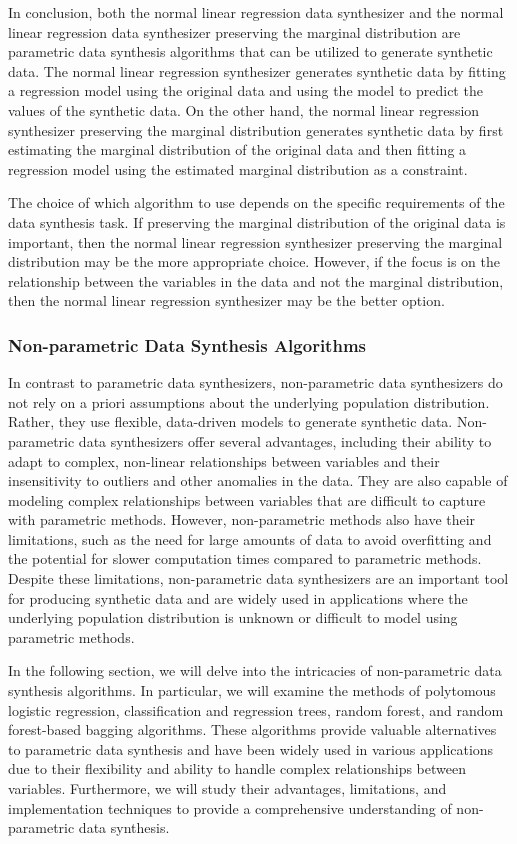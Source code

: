 In conclusion, both the normal linear regression data synthesizer and the normal linear regression data synthesizer preserving the marginal distribution are parametric data synthesis algorithms that can be utilized to generate synthetic data. The normal linear regression synthesizer generates synthetic data by fitting a regression model using the original data and using the model to predict the values of the synthetic data. On the other hand, the normal linear regression synthesizer preserving the marginal distribution generates synthetic data by first estimating the marginal distribution of the original data and then fitting a regression model using the estimated marginal distribution as a constraint.

The choice of which algorithm to use depends on the specific requirements of the data synthesis task. If preserving the marginal distribution of the original data is important, then the normal linear regression synthesizer preserving the marginal distribution may be the more appropriate choice. However, if the focus is on the relationship between the variables in the data and not the marginal distribution, then the normal linear regression synthesizer may be the better option.


\subsubsection{Non-parametric Data Synthesis Algorithms}
\label{subsubsec:non-para}
In contrast to parametric data synthesizers, non-parametric data synthesizers do not rely on a priori assumptions about the underlying population distribution. Rather, they use flexible, data-driven models to generate synthetic data. Non-parametric data synthesizers offer several advantages, including their ability to adapt to complex, non-linear relationships between variables and their insensitivity to outliers and other anomalies in the data. They are also capable of modeling complex relationships between variables that are difficult to capture with parametric methods. However, non-parametric methods also have their limitations, such as the need for large amounts of data to avoid overfitting and the potential for slower computation times compared to parametric methods. Despite these limitations, non-parametric data synthesizers are an important tool for producing synthetic data and are widely used in applications where the underlying population distribution is unknown or difficult to model using parametric methods.

In the following section, we will delve into the intricacies of non-parametric data synthesis algorithms. In particular, we will examine the methods of polytomous logistic regression, classification and regression trees, random forest, and random forest-based bagging algorithms. These algorithms provide valuable alternatives to parametric data synthesis and have been widely used in various applications due to their flexibility and ability to handle complex relationships between variables. Furthermore, we will study their advantages, limitations, and implementation techniques to provide a comprehensive understanding of non-parametric data synthesis.

